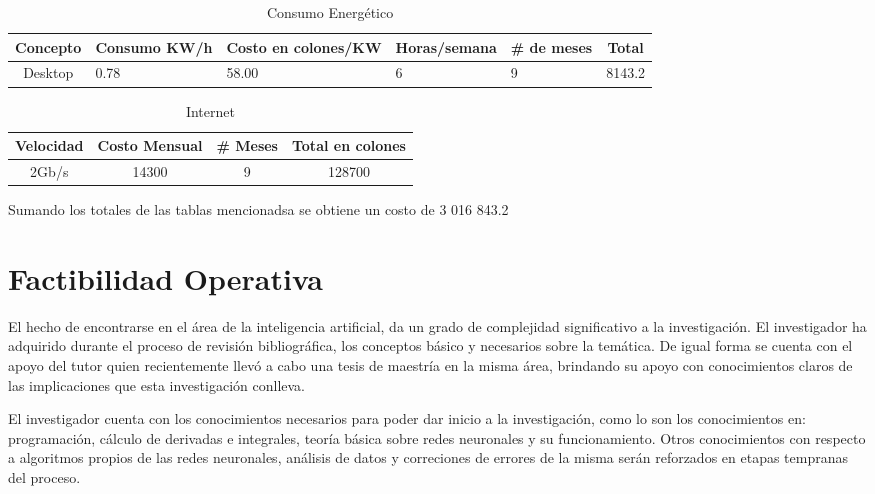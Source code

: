		
	\begin{table}[!h]
			\centering
			\begin{tabular}{|c|p{2cm}|p{2cm}|p{3cm}|p{2cm}|c|}
				\hline
				\textbf{Concepto} & \textbf{Consumo KW/h} & \textbf{Costo en colones/KW} &
				\textbf{Horas/semana} & \textbf{\# de meses} & \textbf{Total}\\ \hline 
				Desktop & 0.78 & 58.00 & 6 & 9 & 8143.2 \\ 
				\hline
			\end{tabular}
			\caption{Consumo Energ\'{e}tico}
			\label{tab:lightpower}
	\end{table}
		
	\begin{table}[!h]
			\centering
			\begin{tabular}{|c|c|c|c|}
				\hline
				\textbf{Velocidad} & \textbf{Costo Mensual} & \textbf{\# Meses} &
				\textbf{Total en colones}\\ \hline 2Gb/s & 14300 & 9 & 128700 \\ 
				\hline
			\end{tabular}
			\caption{Internet}
			\label{tab:internet}
	\end{table}
	
	Sumando los totales de las tablas mencionadsa se obtiene un costo de 3 016
	843.2
	
	\section{Factibilidad Operativa}
	
		El hecho de encontrarse en el \'{a}rea de la inteligencia artificial, da un
grado de complejidad significativo a la investigaci\'{o}n. El investigador ha
adquirido durante el proceso de revisi\'{o}n bibliogr\'{a}fica, los conceptos
b\'{a}sico y necesarios sobre la tem\'{a}tica. De igual forma se cuenta con el
apoyo del tutor quien recientemente llev\'{o} a cabo una tesis de maestr\'{i}a
en la misma \'{a}rea, brindando su apoyo con conocimientos claros de las
implicaciones que esta investigaci\'{o}n conlleva.
		
		El investigador cuenta con los conocimientos necesarios para poder dar
inicio a la investigaci\'{o}n, como lo son los conocimientos en:
programaci\'{o}n, c\'{a}lculo de derivadas e integrales, teor\'{i}a
b\'{a}sica sobre redes neuronales y su funcionamiento. Otros conocimientos con
respecto a algoritmos propios de las redes neuronales, an\'{a}lisis de datos y correciones de errores de la misma ser\'{a}n reforzados en etapas tempranas
del proceso. 
	
